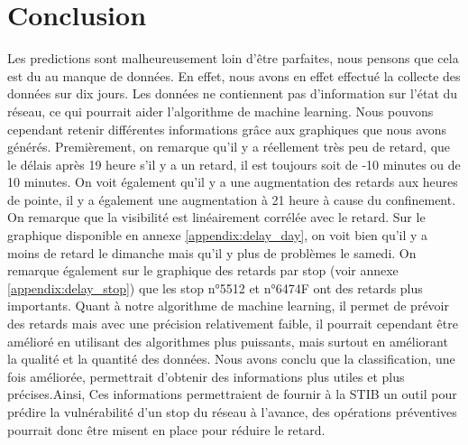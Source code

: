 \chapter{Conclusion}

Les predictions sont malheureusement loin d'être parfaites, nous pensons que cela est du au manque de données. En effet, nous avons en effet effectué la collecte des données sur dix jours. Les données ne contiennent pas d'information sur l'état du réseau, ce qui pourrait aider l'algorithme de machine learning. Nous pouvons cependant retenir différentes informations grâce aux graphiques que nous avons générés. Premièrement, on remarque qu'il y a réellement très peu de retard, que le délais après 19 heure s'il y a un retard, il est toujours soit de -10 minutes ou de 10 minutes. On voit également qu'il y a une augmentation des retards aux heures de pointe, il y a également une augmentation à 21 heure à cause du confinement. On remarque que la visibilité est linéairement corrélée avec le retard. Sur le graphique disponible en annexe \ref{appendix:delay_day}, on voit bien qu'il y a moins de retard le dimanche mais qu'il y plus de problèmes le samedi. On remarque également sur le graphique des retards par stop (voir annexe \ref{appendix:delay_stop}) que les stop n°5512 et n°6474F ont des retards plus importants. Quant à notre algorithme de machine learning, il permet de prévoir des retards mais avec une précision relativement faible, il pourrait cependant être amélioré en utilisant des algorithmes plus puissants, mais surtout en améliorant la qualité et la quantité des données. Nous avons conclu que la classification, une fois améliorée, permettrait d'obtenir des informations plus utiles et plus précises.Ainsi, Ces informations permettraient de fournir à la STIB un outil pour prédire la vulnérabilité d'un stop du réseau à l'avance, des opérations préventives pourrait donc être misent en place pour réduire le retard.
